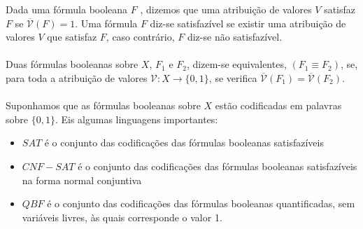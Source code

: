 \documentclass[10pt,a4paper]{report}
\begin{document}
Dada uma fórmula booleana $F$ , dizemos que uma atribuição de valores $V$ satisfaz $F$ se $\overline{\mathcal{V}}(F) = 1$. Uma fórmula $F$ diz-se satisfazível se existir uma
atribuição de valores $V$ que satisfaz $F$, caso contrário, $F$ diz-se não satisfazível.\\
\\
Duas fórmulas booleanas sobre $X$, $F_1$ e $F_2$, dizem-se equivalentes, $(F_1 \equiv F_2)$, se, para toda a atribuição de valores $\mathcal{V} : X \rightarrow \{0, 1\}$, se verifica $\overline{\mathcal{V}}(F_1) = \overline{\mathcal{V}}(F_2)$.\\
\\
Suponhamos que as fórmulas booleanas sobre $X$ estão codificadas em palavras sobre $\{0, 1\}$. Eis algumas linguagens importantes:
\begin{itemize}
\item $SAT$ é o conjunto das codificações das fórmulas booleanas satisfazíveis
\item $CNF-SAT$ é o conjunto das codificações das fórmulas booleanas satisfazíveis na forma normal conjuntiva
\item $QBF$ é o conjunto das codificações das fórmulas booleanas quantificadas, sem variáveis livres, às quais corresponde o valor 1.
\end{itemize}
\end{document}
